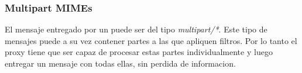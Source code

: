 \documentclass[11pt,a4paper,titlepage]{article}
\begin{document}
\subsubsection{Multipart MIMEs}
El mensaje entregado por un \os puede ser del tipo \textit{multipart/*}.
Este tipo de mensajes puede a su vez contener partes a las que apliquen filtros.
Por lo tanto el proxy tiene que ser capaz de procesar estas partes individualmente y luego entregar un mensaje con todas ellas, sin perdida de informacion.

\end{document}
